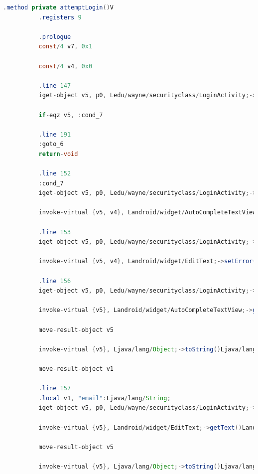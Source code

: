\documentclass[onecolumn,oneside]{SUSTechHomework}
\begin{document}
    \begin{lstlisting}[language={java}]
      .method private attemptLogin()V
          .registers 9
      
          .prologue
          const/4 v7, 0x1
      
          const/4 v4, 0x0
      
          .line 147
          iget-object v5, p0, Ledu/wayne/securityclass/LoginActivity;->mAuthTask:Ledu/wayne/securityclass/LoginActivity$UserLoginTask;
      
          if-eqz v5, :cond_7
      
          .line 191
          :goto_6
          return-void
      
          .line 152
          :cond_7
          iget-object v5, p0, Ledu/wayne/securityclass/LoginActivity;->mEmailView:Landroid/widget/AutoCompleteTextView;
      
          invoke-virtual {v5, v4}, Landroid/widget/AutoCompleteTextView;->setError(Ljava/lang/CharSequence;)V
      
          .line 153
          iget-object v5, p0, Ledu/wayne/securityclass/LoginActivity;->mPasswordView:Landroid/widget/EditText;
      
          invoke-virtual {v5, v4}, Landroid/widget/EditText;->setError(Ljava/lang/CharSequence;)V
      
          .line 156
          iget-object v5, p0, Ledu/wayne/securityclass/LoginActivity;->mEmailView:Landroid/widget/AutoCompleteTextView;
      
          invoke-virtual {v5}, Landroid/widget/AutoCompleteTextView;->getText()Landroid/text/Editable;
      
          move-result-object v5
      
          invoke-virtual {v5}, Ljava/lang/Object;->toString()Ljava/lang/String;
      
          move-result-object v1
      
          .line 157
          .local v1, "email":Ljava/lang/String;
          iget-object v5, p0, Ledu/wayne/securityclass/LoginActivity;->mPasswordView:Landroid/widget/EditText;
      
          invoke-virtual {v5}, Landroid/widget/EditText;->getText()Landroid/text/Editable;
      
          move-result-object v5
      
          invoke-virtual {v5}, Ljava/lang/Object;->toString()Ljava/lang/String;
      

\end{lstlisting}
\end{document}
